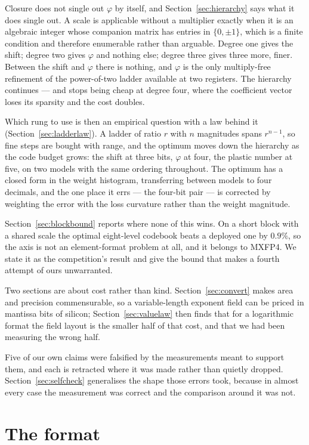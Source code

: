 \documentclass[11pt]{article}
\theoremstyle{definition}
\begin{document}
Closure does not single out $\varphi$ by itself, and Section~\ref{sec:hierarchy}
says what it does single out. A scale is applicable without a multiplier exactly
when it is an algebraic integer whose companion matrix has entries in
$\{0,\pm1\}$, which is a finite condition and therefore enumerable rather than
arguable. Degree one gives the shift; degree two gives $\varphi$ and nothing
else; degree three gives three more, finer. Between the shift and $\varphi$
there is nothing, and $\varphi$ is the only multiply-free refinement of the
power-of-two ladder available at two registers. The hierarchy continues --- and
stops being cheap at degree four, where the coefficient vector loses its
sparsity and the cost doubles.

Which rung to use is then an empirical question with a law behind it
(Section~\ref{sec:ladderlaw}). A ladder of ratio $r$ with $n$ magnitudes spans
$r^{n-1}$, so fine steps are bought with range, and the optimum moves down the
hierarchy as the code budget grows: the shift at three bits, $\varphi$ at four,
the plastic number at five, on two models with the same ordering throughout. The
optimum has a closed form in the weight histogram, transferring between models
to four decimals, and the one place it errs --- the four-bit pair --- is
corrected by weighting the error with the loss curvature rather than the weight
magnitude.

Section~\ref{sec:blockbound} reports where none of this wins. On a short block
with a shared scale the optimal eight-level codebook beats a deployed one by
$0.9\%$, so the axis is not an element-format problem at all, and it belongs to
MXFP4. We state it as the competition's result and give the bound that makes a
fourth attempt of ours unwarranted.

Two sections are about cost rather than kind. Section~\ref{sec:convert} makes
area and precision commensurable, so a variable-length exponent field can be
priced in mantissa bits of silicon; Section~\ref{sec:valuelaw} then finds that
for a logarithmic format the field layout is the smaller half of that cost, and
that we had been measuring the wrong half.

Five of our own claims were falsified by the measurements meant to support them,
and each is retracted where it was made rather than quietly dropped.
Section~\ref{sec:selfcheck} generalises the shape those errors took, because in
almost every case the measurement was correct and the comparison around it was
not.

\section{The format}\label{sec:format}
\end{document}
